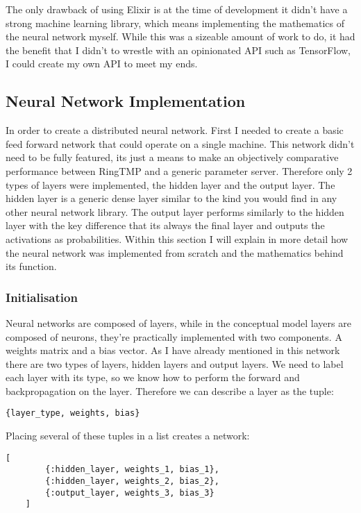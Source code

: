 The only drawback of using Elixir is at the time of development it didn't have a
strong machine learning library, which means implementing the mathematics of the
neural network myself. While this was a sizeable amount of work to do, it had
the benefit that I didn't to wrestle with an opinionated API such as TensorFlow,
I could create my own API to meet my ends.

\subsection{Neural Network Implementation}
In order to create a distributed neural network. First I needed to create a
basic feed forward network that could operate on a single machine. This network
didn't need to be fully featured, its just a means to make an objectively
comparative performance between RingTMP and a generic parameter server.
Therefore only 2 types of layers were implemented, the hidden layer and the
output layer. The hidden layer is a generic dense layer similar to the kind you
would find in any other neural network library. The output layer performs
similarly to the hidden layer with the key difference that its always the final
layer and outputs the activations as probabilities. Within this section I will
explain in more detail how the neural network was implemented from scratch and
the mathematics behind its function.

\subsubsection{Initialisation}
Neural networks are composed of layers, while in the conceptual model layers are
composed of neurons, they're practically implemented with two components. A
weights matrix and a bias vector. As I have already mentioned in this network
there are two types of layers, hidden layers and output layers. We need to label
each layer with its type, so we know how to perform the forward and
backpropagation on the layer. Therefore we can describe a layer as the tuple:
\begin{lstlisting}[numbers=none,frame=none]
    {layer_type, weights, bias}
\end{lstlisting}

Placing several of these tuples in a list creates a network:
\begin{lstlisting}[numbers=none,frame=none]
    [
        {:hidden_layer, weights_1, bias_1},
        {:hidden_layer, weights_2, bias_2},
        {:output_layer, weights_3, bias_3}
    ]
\end{lstlisting}

